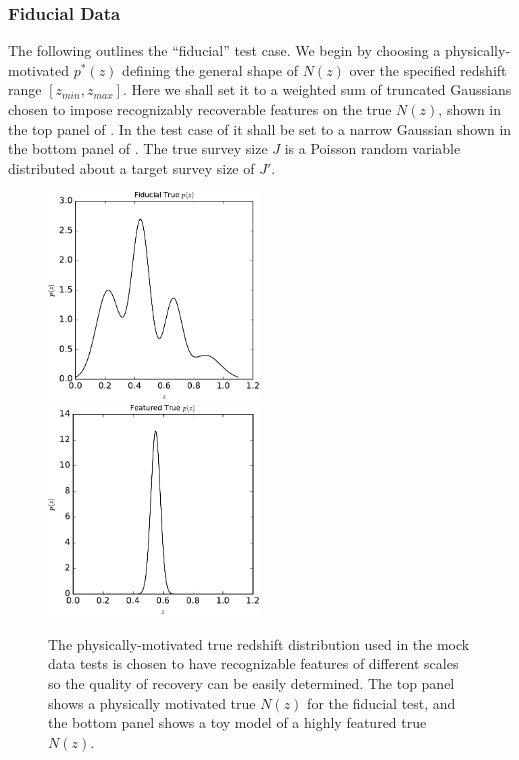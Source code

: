 \subsubsection{Fiducial Data}

The following outlines the ``fiducial'' test case.  
We begin by choosing a physically-motivated $p^{*}(z)$ defining the general shape of $N(z)$ over the specified redshift range $[z_{min},z_{max}]$.  
Here we shall set it to a weighted sum of truncated Gaussians chosen to impose recognizably recoverable features on the true $N(z)$, shown in the top panel of .  
In the test case of  it shall be set to a narrow Gaussian shown in the bottom panel of .  
The true survey size $J$ is a Poisson random variable distributed about a target survey size of $J'$.

\begin{figure}
	\includegraphics[width=0.5\textwidth]{figures/chippr/sig2_physPz.pdf}\\
	\includegraphics[width=0.5\textwidth]{figures/chippr/delt_physPz.pdf}
	\caption{The physically-motivated true redshift distribution used in the mock data tests is chosen to have recognizable features of different scales so the quality of recovery can be easily determined.  
		The top panel shows a physically motivated true $N(z)$ for the fiducial test, and the bottom panel shows a toy model of a highly featured true $N(z)$.}
\end{figure}

